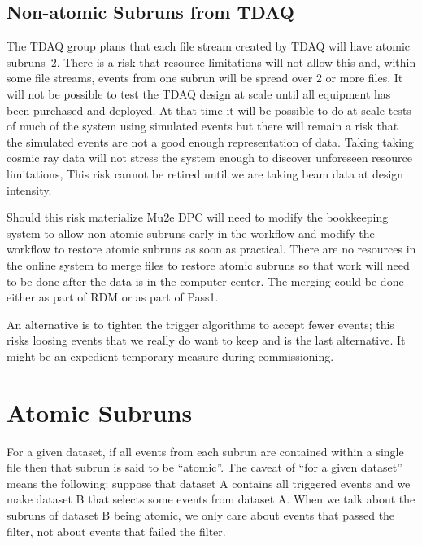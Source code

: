 \section{Non-atomic Subruns from TDAQ}
\label{sec:Risk:NonAtomicSubruns}

The TDAQ group plans that each file stream created by TDAQ will have atomic subruns~\ref{ch:AtomicSubrunsExtendedDefinition}.
There is a risk that resource limitations will not allow this and, within some file streams,
events from one subrun will be spread over 2 or more files.  It will not be possible
to test the TDAQ design at scale until all equipment has been purchased and deployed.
At that time it will be possible to do at-scale tests of much of the system using simulated events
but there will remain a risk that the simulated events are not a good enough representation of data.
Taking taking cosmic ray data will not stress the system enough to discover unforeseen resource limitations,
This risk cannot be retired until we are taking beam data at design intensity.

Should this risk materialize Mu2e DPC will need to modify the bookkeeping
system to allow non-atomic subruns early in the workflow and modify the workflow
to restore atomic subruns as soon as practical.
There are no resources in the online system to merge files to restore atomic subruns
so that work will need to be done after the data is in the computer center.
The merging could be done either as part of RDM or as part of Pass1.

An alternative is to tighten the trigger algorithms to accept fewer events;
this risks loosing events that we really do want to keep and is the last alternative.
It might be an expedient temporary measure during commissioning.


\appendix

\chapter{Atomic Subruns}
\label{ch:AtomicSubrunsExtendedDefinition}

For a given dataset, if all events from each subrun are contained within a single \art file
then that subrun is said to be ``atomic''.
The caveat of ``for a given dataset'' means the following:
suppose that dataset A contains all triggered events
and we make dataset B that selects some events from dataset A.
When we talk about the subruns of dataset B being atomic, we only care about events
that passed the filter, not about events that failed the filter.

